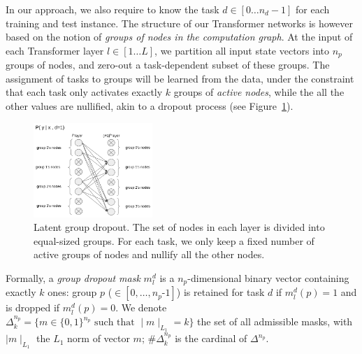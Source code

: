 \documentclass[11pt]{article}
\newcommand{\fyDone}[1]{\done[FY]\Todo[FY:]{\textcolor{orange}{#1}}}
\begin{document}
In our approach, we also require to know the task $d \in [0 \dots n_d-1]$ for each training and test instance. The structure of our Transformer networks \citep{Vaswani17attention} is however based on the notion of \emph{groups of nodes in the computation graph}. At the input of each Transformer layer $l \in [1 \dots L]$, we partition all input state vectors into $n_p$ groups of nodes, and zero-out a task-dependent subset of these groups.\fyDone{In the attention heads only? In the FF?} The assignment of tasks to groups will be learned from the data, under the constraint that each task only activates exactly $k$ groups of \emph{active nodes}, while the all the other values are nullified, akin to a dropout process (see Figure~\ref{fig:group_dropout}).
\begin{figure}
  \centering
\includegraphics[width=0.4\textwidth]{group_dropout}
\caption{Latent group dropout. The set of nodes\fyDone{parameters ?} in each layer is divided into equal-sized groups. For each task, we only keep a fixed number of active groups of nodes and nullify all the other nodes.
}
\label{fig:group_dropout}
\end{figure}
Formally, a \emph{group dropout mask} $m_l^d$ is a $n_p$-dimensional binary vector containing exactly $k$ ones: group $p$ ($\in  [0,\dots,n_p\text{-}1]$) is retained for task $d$ if $m_l^d(p) =1$ and is dropped if $m_l^d(p) = 0$. We denote $\Delta^{n_p}_k = \{ m \in \{0,1\}^{n_p} \text{ such that }  \mid{} m \mid_{L_1} = k \}$ the set of all admissible masks, with $\mid{} m \mid_{L_1}$ the $L_1$ norm of vector $m$; $\#\Delta^{n_p}_k$ is the cardinal of $\Delta^{n_p}$.
\end{document}
